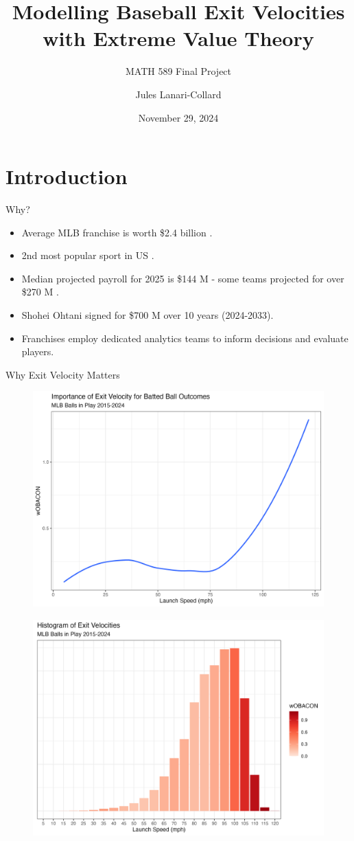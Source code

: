 \documentclass{beamer}
\title{Modelling Baseball Exit Velocities with Extreme Value Theory}
\subtitle{MATH 589 Final Project}
\author{Jules Lanari-Collard}
\institute{McGill University}
\date{November 29, 2024}
\begin{document}
\frame{\titlepage}
\section{Introduction}

\begin{frame}{Why?}
\begin{itemize}
    \item Average MLB franchise is worth \$2.4 billion \cite{forbesValuations}.
    \item 2nd most popular sport in US \cite{gallupPoll}.
    \item Median projected payroll for 2025 is \$144 M - some teams projected for over \$270 M \cite{fgRosterResource}.
    \item Shohei Ohtani signed for \$700 M over 10 years (2024-2033).
    \item Franchises employ dedicated analytics teams to inform decisions and evaluate players.
\end{itemize}
\end{frame}

\begin{frame}[allowframebreaks]{Why Exit Velocity Matters}
    \begin{figure}
        \centering
        \includegraphics[width=0.85\linewidth]{plots/ev_woba.png}
    \end{figure}
    
    \begin{figure}
        \centering
        \includegraphics[width=0.85\linewidth]{plots/evHistogram.png}
    \end{figure}
\end{frame}
\end{document}
